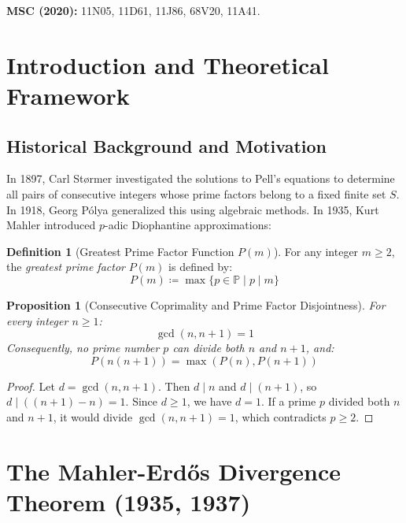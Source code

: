 \documentclass[11pt,a4paper]{article}
\newtheorem{proposition}[theorem]{Proposition}
\theoremstyle{definition}
\newtheorem{definition}[theorem]{Definition}
\begin{document}
\noindent\textbf{MSC (2020):} 11N05, 11D61, 11J86, 68V20, 11A41.

\tableofcontents
\newpage

\section{Introduction and Theoretical Framework}

\subsection{Historical Background and Motivation}
In 1897, Carl St\o{}rmer \cite{stormer1897} investigated the solutions to Pell's equations to determine all pairs of consecutive integers whose prime factors belong to a fixed finite set $S$.
In 1918, Georg P\'olya generalized this using algebraic methods.
In 1935, Kurt Mahler \cite{mahler1935} introduced $p$-adic Diophantine approximations:

\begin{definition}[Greatest Prime Factor Function $P(m)$]\label{def:greatest_prime_factor}
For any integer $m \ge 2$, the \emph{greatest prime factor} $P(m)$ is defined by:
\begin{equation}\label{eq:p_max_def}
P(m) \coloneqq \max \{ p \in \mathbb{P} \mid p \mid m \}
\end{equation}
\end{definition}

\begin{proposition}[Consecutive Coprimality and Prime Factor Disjointness]\label{prop:consec_coprime}
For every integer $n \ge 1$:
\begin{equation}\label{eq:coprime_id}
\gcd(n, n+1) = 1
\end{equation}
Consequently, no prime number $p$ can divide both $n$ and $n+1$, and:
\begin{equation}\label{eq:p_max_consec}
P(n(n+1)) = \max(P(n), P(n+1))
\end{equation}
\end{proposition}

\begin{proof}
Let $d = \gcd(n, n+1)$. Then $d \mid n$ and $d \mid (n+1)$, so $d \mid ((n+1) - n) = 1$. Since $d \ge 1$, we have $d = 1$.
If a prime $p$ divided both $n$ and $n+1$, it would divide $\gcd(n, n+1) = 1$, which contradicts $p \ge 2$.
\end{proof}

\section{The Mahler-Erd\H{o}s Divergence Theorem (1935, 1937)}
\end{document}
